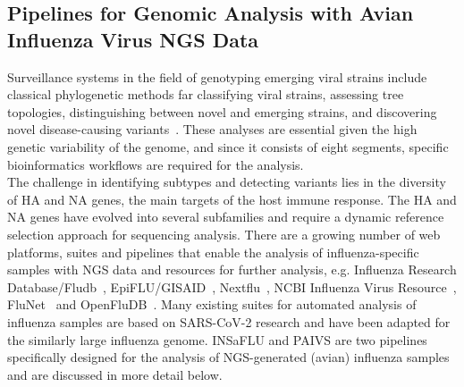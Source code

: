\subsection{Pipelines for Genomic Analysis with Avian Influenza Virus NGS Data}
Surveillance systems in the field of genotyping emerging viral strains include classical phylogenetic methods far classifying viral strains, assessing tree topologies, distinguishing between novel and emerging strains, and discovering novel disease-causing variants~\cite{koboldt2013next}. These analyses are essential given the high genetic variability of the genome, and since it consists of eight segments, specific bioinformatics workflows are required for the analysis. \\
The challenge in identifying subtypes and detecting variants lies in the diversity of HA and NA genes, the main targets of the host immune response. The HA and NA genes have evolved into several subfamilies and require a dynamic reference selection approach for sequencing analysis. There are a growing number of web platforms, suites and pipelines that enable the analysis of influenza-specific samples with NGS data and resources for further analysis, e.g. Influenza Research Database/Fludb~\cite{zhang2017influenza}, EpiFLU/GISAID~\cite{shu2017gisaid}, Nextflu~\cite{neher2015nextflu}, NCBI Influenza Virus Resource~\cite{bao2008influenza}, FluNet~\cite{flahault1998flunet} and OpenFluDB~\cite{liechti2010openfludb}. Many existing suites for automated analysis of influenza samples are based on SARS-CoV-2 research and have been adapted for the similarly large influenza genome. INSaFLU and PAIVS are two pipelines specifically designed for the analysis of NGS-generated (avian) influenza samples and are discussed in more detail below.

